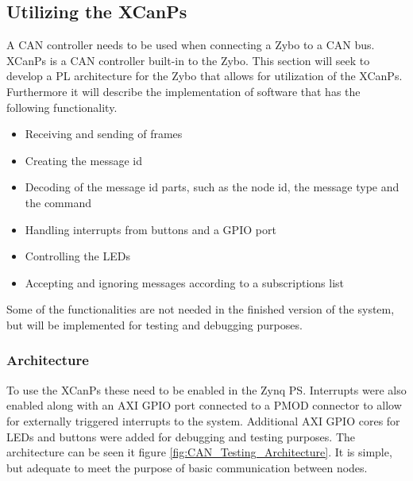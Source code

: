 \subsection{Utilizing the XCanPs}
\label{sub:TestingCANStack_BareMetal}
A CAN controller needs to be used when connecting a Zybo to a CAN bus.
XCanPs is a CAN controller built-in to the Zybo.
This section will seek to develop a PL architecture for the Zybo that allows for utilization of the XCanPs.
Furthermore it will describe the implementation of software that has the following functionality.
\begin{itemize}
\item Receiving and sending of frames
\item Creating the message id
\item Decoding of the message id parts, such as the node id, the message type and the command
\item Handling interrupts from buttons and a GPIO port
\item Controlling the LEDs
\item Accepting and ignoring messages according to a subscriptions list
\end{itemize}
Some of the functionalities are not needed in the finished version of the system, but will be implemented for testing and debugging purposes.

\subsubsection*{Architecture}
To use the XCanPs these need to be enabled in the Zynq PS.
Interrupts were also enabled along with an AXI GPIO port connected to a PMOD connector to allow for externally triggered interrupts to the system.
Additional AXI GPIO cores for LEDs and buttons were added for debugging and testing purposes.
The architecture can be seen it figure \ref{fig:CAN_Testing_Architecture}. 
It is simple, but adequate to meet the purpose of basic communication between nodes.

